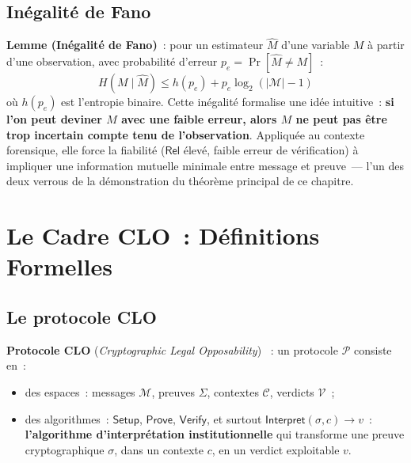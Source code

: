 \subsection{Inégalité de Fano}

\begin{boxjuris}
\textbf{Lemme (Inégalité de Fano)}~: pour un estimateur $\hat M$
d'une variable $M$ à partir d'une observation, avec probabilité
d'erreur $p_e = \Pr[\hat M \neq M]$~:
\begin{equation}
H(M \mid \hat M) \leq h(p_e) + p_e \log_2(|\mathcal{M}|-1)
\label{eq:fano}
\end{equation}
où $h(p_e)$ est l'entropie binaire. Cette inégalité formalise une
idée intuitive~: \textbf{si l'on peut deviner $M$ avec une faible
erreur, alors $M$ ne peut pas être trop incertain compte tenu de
l'observation}. Appliquée au contexte forensique, elle force la
fiabilité ($\mathsf{Rel}$ élevé, faible erreur de vérification) à
impliquer une information mutuelle minimale entre message et
preuve~--- l'un des deux verrous de la démonstration du théorème
principal de ce chapitre.
\end{boxjuris}

\section{Le Cadre CLO~: Définitions Formelles}
\label{sec:cadre-clo}

\subsection{Le protocole CLO}

\begin{boxdef}
\textbf{Protocole CLO} (\textit{Cryptographic Legal Opposability})
\cite{minka2026clo}~: un protocole $\mathcal{P}$ consiste en~:
\begin{itemize}
    \item des espaces~: messages $\mathcal{M}$, preuves $\Sigma$,
          contextes $\mathcal{C}$, verdicts $\mathcal{V}$~;
    \item des algorithmes~: $\mathsf{Setup}$, $\mathsf{Prove}$,
          $\mathsf{Verify}$, et surtout
          $\mathsf{Interpret}(\sigma, c) \to v$~: \textbf{l'algorithme
          d'interprétation institutionnelle} qui transforme une
          preuve cryptographique $\sigma$, dans un contexte $c$,
          en un verdict exploitable $v$.
\end{itemize}
\end{boxdef}

